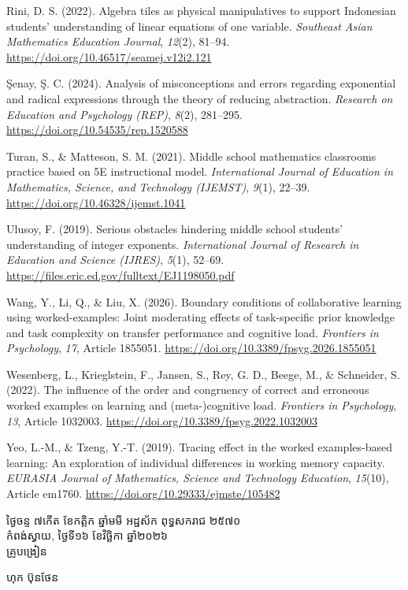 \documentclass[a4paper,12pt]{article}
\begin{document}
{Rini, D. S. (2022). Algebra tiles as physical manipulatives to support Indonesian students' understanding of linear equations of one variable. \textit{Southeast Asian Mathematics Education Journal}, \textit{12}(2), 81--94. \url{https://doi.org/10.46517/seamej.v12i2.121}

Şenay, Ş. C. (2024). Analysis of misconceptions and errors regarding exponential and radical expressions through the theory of reducing abstraction. \textit{Research on Education and Psychology (REP)}, \textit{8}(2), 281--295. \url{https://doi.org/10.54535/rep.1520588}

Turan, S., \& Matteson, S. M. (2021). Middle school mathematics classrooms practice based on 5E instructional model. \textit{International Journal of Education in Mathematics, Science, and Technology (IJEMST)}, \textit{9}(1), 22--39. \url{https://doi.org/10.46328/ijemst.1041}

Ulusoy, F. (2019). Serious obstacles hindering middle school students' understanding of integer exponents. \textit{International Journal of Research in Education and Science (IJRES)}, \textit{5}(1), 52--69. \url{https://files.eric.ed.gov/fulltext/EJ1198050.pdf}

Wang, Y., Li, Q., \& Liu, X. (2026). Boundary conditions of collaborative learning using worked-examples: Joint moderating effects of task-specific prior knowledge and task complexity on transfer performance and cognitive load. \textit{Frontiers in Psychology}, \textit{17}, Article 1855051. \url{https://doi.org/10.3389/fpsyg.2026.1855051}

Wesenberg, L., Krieglstein, F., Jansen, S., Rey, G. D., Beege, M., \& Schneider, S. (2022). The influence of the order and congruency of correct and erroneous worked examples on learning and (meta-)cognitive load. \textit{Frontiers in Psychology}, \textit{13}, Article 1032003. \url{https://doi.org/10.3389/fpsyg.2022.1032003}

Yeo, L.-M., \& Tzeng, Y.-T. (2019). Tracing effect in the worked examples-based learning: An exploration of individual differences in working memory capacity. \textit{EURASIA Journal of Mathematics, Science and Technology Education}, \textit{15}(10), Article em1760. \url{https://doi.org/10.29333/ejmste/105482}
\par}

\vspace{8pt}
\Needspace{2.2cm}
\hfill
\begin{minipage}{9.8cm}
  {\centering
    ថ្ងៃចន្ទ ៧កើត ខែកត្តិក ឆ្នាំមមី អដ្ឋស័ក ពុទ្ធសករាជ ២៥៧០\\[2pt]
    កំពង់ស្វាយ, ថ្ងៃទី១៦ ខែវិច្ឆិកា ឆ្នាំ២០២៦\\[3pt]
    {\muol\fontsize{11.5pt}{18pt}\selectfont គ្រូបង្រៀន}\par}
  \vspace{32pt}
  \hfill{\muol\fontsize{11.5pt}{18pt}\selectfont ហុក ប៊ុនថែន}\hspace*{1.4cm}
\end{minipage}
\end{document}
